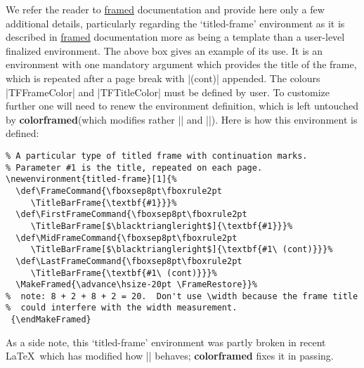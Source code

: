 \documentclass[a4paper,dvipdfmx,11pt]{article}
\def\ctanpackage#1{\href{https://ctan.org/pkg/#1}{#1}}
\newcommand\colorframed{%
        \texorpdfstring{{\color{joli}\bfseries colorframed}}{colorframed}\xspace}
\begin{document}
\begin{shaded*}
  We refer the reader to \ctanpackage{framed} documentation
  and provide here only a few additional details, particularly
  regarding the `titled-frame' environment as it is described
  in \ctanpackage{framed} documentation more as being a
  template than a user-level finalized environment.  The above
  box gives an example of its use.  It is an environment with
  one mandatory argument which provides the title of the
  frame, which is repeated after a page break with |(cont)|
  appended.  The colours |TFFrameColor| and
  |TFTitleColor| must be defined by user.  To customize
  further one will need to renew the environment definition,
  which is left untouched by \colorframed (which modifies
  rather |\TitleBarFrame| and |\CustomFBox|).  Here is
  how this environment is defined:
\begin{verbatim}
% A particular type of titled frame with continuation marks.  
% Parameter #1 is the title, repeated on each page.
\newenvironment{titled-frame}[1]{%
  \def\FrameCommand{\fboxsep8pt\fboxrule2pt
     \TitleBarFrame{\textbf{#1}}}%
  \def\FirstFrameCommand{\fboxsep8pt\fboxrule2pt
     \TitleBarFrame[$\blacktriangleright$]{\textbf{#1}}}%
  \def\MidFrameCommand{\fboxsep8pt\fboxrule2pt
     \TitleBarFrame[$\blacktriangleright$]{\textbf{#1\ (cont)}}}%
  \def\LastFrameCommand{\fboxsep8pt\fboxrule2pt
     \TitleBarFrame{\textbf{#1\ (cont)}}}%
  \MakeFramed{\advance\hsize-20pt \FrameRestore}}%
%  note: 8 + 2 + 8 + 2 = 20.  Don't use \width because the frame title
%  could interfere with the width measurement.
 {\endMakeFramed}
\end{verbatim}
\begin{footnotesize}\normalcolor
As a side note, this `titled-frame' environment was partly
broken in recent \LaTeX\ which has modified how |\smash|
behaves; \colorframed fixes it in passing.\par
\end{footnotesize}
\end{shaded*}
\end{document}
